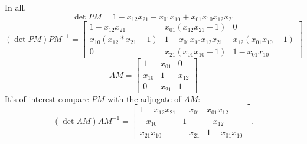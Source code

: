 \documentclass[12pt]{article}
\begin{document}
In all,
\[
\det PM= 1  - x_{12}x_{21}  - x_{01}x_{10} + x_{01}x_{10}x_{12}x_{21}
\]
\[
(\det PM)PM^{-1}=\left[ \begin{matrix}
    1 - x_{12}x_{21}           & x_{01}(x_{12}x_{21} - 1)     & 0 \\
    x_{10}(x_{12}*x_{21} - 1) & 1 - x_{01}x_{10}x_{12}x_{21}  & x_{12}(x_{01}x_{10} - 1) \\
    0                        &  x_{21}(x_{01}x_{10} - 1)    & 1 - x_{01}x_{10}
  \end{matrix} \right]
\]
\[
AM = \left[ \begin{matrix}
    1     & x_{01}  & 0 \\
    x_{10} & 1      & x_{12} \\
    0     & x_{21}  & 1
  \end{matrix} \right]
\]
It's of interest compare $PM$ with the adjugate of $AM$:
\[
(\det AM)AM^{-1}= \left[ \begin{matrix}
    1 - x_{12}x_{21} & -x_{01}    & x_{01}x_{12} \\
    -x_{10}         &   1       &  -x_{12}      \\
    x_{21}x_{10}     &   -x_{21}  &  1 - x_{01}x_{10}
  \end{matrix} \right].
\]
\end{document}
